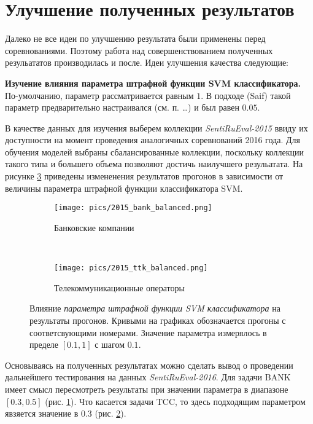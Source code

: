 \section{Улучшение полученных результатов}
Далеко не все идеи по улучшению результата были применены перед соревнованиями.
Поэтому работа над совершенствованием полученных резульататов производилась и
после. Идеи улучшения качества следующие:

{\bf Изучение влияния параметра штрафной функции SVM классификатора.}
По-умолчанию, параметр рассматривается равным $1$. В подходе (Saif) такой
параметр предварительно настраивался (см. п. …) и был равен $0.05$.


В качестве данных для изучения выберем коллекции {\it SentiRuEval-2015} ввиду их
доступности на момент проведения аналогичных соревнований 2016 года. Для
обучения моделей выбраны сбалансированные коллекции, поскольку коллекции такого
типа и большего объема позволяют достичь наилучшего резульатата. На рисунке
\ref{fig:cost} приведены измененения результатов прогонов в зависимости от
величины параметра штрафной функции классификатора SVM.

\begin{figure}[!htp] \centering
    \begin{subfigure}[b]{0.45\textwidth}
        \texttt{[image: pics/2015\_bank\_balanced.png]}
        \caption{Банковские компании}
        \label{fig:bank_cost_changes}
    \end{subfigure}
    ~
    \begin{subfigure}[b]{0.45\textwidth}
        \texttt{[image: pics/2015\_ttk\_balanced.png]}
        \caption{Телекоммуникационные операторы}
        \label{fig:ttk_cost_changes}
    \end{subfigure}
    \caption{
        Влияние {\it параметра штрафной функции SVM классификатора}
        на результаты прогонов.
        Кривыми на графиках обозначается прогоны с соответсвующими номерами.
        Значение параметра измерялось в пределе $[0.1, 1]$ с шагом $0.1$.
    }
    \label{fig:cost}
\end{figure}

Основываясь на полученных результатах можно сделать вывод о проведении дальнейшего
тестирования на данных {\it SentiRuEval-2016}.
Для задачи BANK имеет смысл пересмотреть результаты при значении параметра в
диапазоне $[0.3, 0.5]$ (рис. \ref{fig:bank_cost_changes}).
Что касается задачи TCC, то здесь подходящим параметром явзяется значение в $0.3$
(рис. \ref{fig:ttk_cost_changes}).

